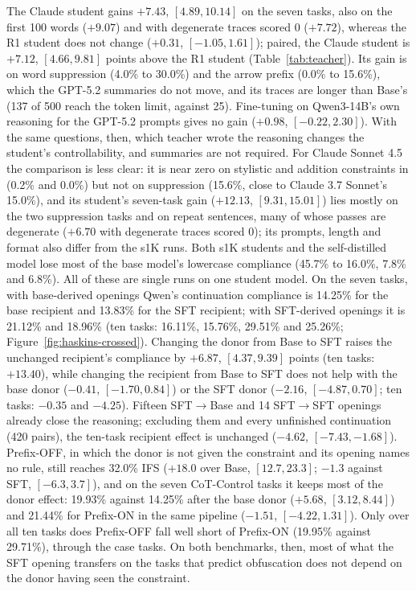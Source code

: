 The Claude student gains $+7.43$, $[4.89, 10.14]$ on the seven tasks, also on the first 100 words ($+9.07$) and with degenerate traces scored 0 ($+7.72$), whereas the R1 student does not change ($+0.31$, $[-1.05, 1.61]$); paired, the Claude student is $+7.12$, $[4.66, 9.81]$ points above the R1 student (Table~\ref{tab:teacher}). Its gain is on word suppression (4.0\% to 30.0\%) and the arrow prefix (0.0\% to 15.6\%), which the GPT-5.2 summaries do not move, and its traces are longer than Base's (137 of 500 reach the token limit, against 25). Fine-tuning on Qwen3-14B's own reasoning for the GPT-5.2 prompts gives no gain ($+0.98$, $[-0.22, 2.30]$). With the same questions, then, which teacher wrote the reasoning changes the student's controllability, and summaries are not required. For Claude Sonnet 4.5 the comparison is less clear: it is near zero on stylistic and addition constraints in \citet{chen2026cotcontrol} (0.2\% and 0.0\%) but not on suppression (15.6\%, close to Claude 3.7 Sonnet's 15.0\%), and its student's seven-task gain ($+12.13$, $[9.31, 15.01]$) lies mostly on the two suppression tasks and on repeat sentences, many of whose passes are degenerate ($+6.70$ with degenerate traces scored 0); its prompts, length and format also differ from the s1K runs. Both s1K students and the self-distilled model lose most of the base model's lowercase compliance (45.7\% to 16.0\%, 7.8\% and 6.8\%). All of these are single runs on one student model.
On the seven tasks, with base-derived openings Qwen's continuation compliance is 14.25\% for the base recipient and 13.83\% for the SFT recipient; with SFT-derived openings it is 21.12\% and 18.96\% (ten tasks: 16.11\%, 15.76\%, 29.51\% and 25.26\%; Figure~\ref{fig:haskins-crossed}). Changing the donor from Base to SFT raises the unchanged recipient's compliance by $+6.87$, $[4.37, 9.39]$ points (ten tasks: $+13.40$), while changing the recipient from Base to SFT does not help with the base donor ($-0.41$, $[-1.70, 0.84]$) or the SFT donor ($-2.16$, $[-4.87, 0.70]$; ten tasks: $-0.35$ and $-4.25$). Fifteen SFT$\to$Base and 14 SFT$\to$SFT openings already close the reasoning; excluding them and every unfinished continuation (420 pairs), the ten-task recipient effect is unchanged ($-4.62$, $[-7.43, -1.68]$).
Prefix-OFF, in which the donor is not given the constraint and its opening names no rule, still reaches 32.0\% IFS ($+18.0$ over Base, $[12.7, 23.3]$; $-1.3$ against SFT, $[-6.3, 3.7]$), and on the seven CoT-Control tasks it keeps most of the donor effect: 19.93\% against 14.25\% after the base donor ($+5.68$, $[3.12, 8.44]$) and 21.44\% for Prefix-ON in the same pipeline ($-1.51$, $[-4.22, 1.31]$). Only over all ten tasks does Prefix-OFF fall well short of Prefix-ON (19.95\% against 29.71\%), through the case tasks. On both benchmarks, then, most of what the SFT opening transfers on the tasks that predict obfuscation does not depend on the donor having seen the constraint.

